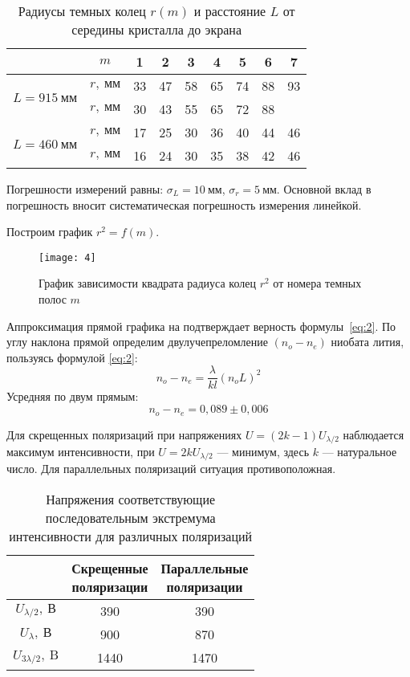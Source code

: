 \documentclass[a4paper, 12pt]{article}
\begin{document}
\renewcommand{\arraystretch}{1.2}
\begin{table}[H]
\centering
\begin{tabular}{|c|c|c|c|c|c|c|c|c|}
\hline
                  & $m$ & 1  & 2  & 3  & 4  & 5  & 6  & 7  \\ \hline
    \multirow{2}{*}{$L = 915\ \text{мм}$} & $r,\ \text{мм}$ & 33 & 47 & 58 & 65 & 74 & 88 & 93 \\ \cline{2-9} 
                   & $r,\ \text{мм}$ & 30 & 43 & 55 & 65 & 72 & 88 &    \\ \hline
\multirow{2}{*}{$L = 460\ \text{мм}$} & $r,\ \text{мм}$ & 17 & 25 & 30 & 36 & 40 & 44 & 46 \\ \cline{2-9} 
                   & $r,\ \text{мм}$ & 16 & 24 & 30 & 35 & 38 & 42 & 46 \\ \hline
\end{tabular}
\caption{Радиусы темных колец $r(m)$ и расстояние $L$ от середины
кристалла до экрана}
\end{table}

Погрешности измерений равны: $\sigma_L = 10\ \text{мм}$, $\sigma_r =
5\ \text{мм}$. Основной вклад в погрешность вносит систематическая
погрешность измерения линейкой.

Построим график $r^2 = f(m)$. 
\begin{figure}[H]
    \texttt{[image: 4]} 
    \caption{График зависимости квадрата радиуса колец $r^2$ от номера
    темных полос $m$}
    \label{fig:4}
\end{figure}

Аппроксимация прямой графика на  подтверждает верность
формулы~\eqref{eq:2}. По углу наклона прямой определим
двулучепреломление $(n_o-n_e)$ ниобата лития, пользуясь формулой
\eqref{eq:2}:
\[
    n_o - n_e = \frac{\lambda}{k l}(n_o L)^2
\]
Усредняя по двум прямым:
\[
    n_o - n_e = 0,089\pm 0,006
\]

Для скрещенных поляризаций при напряжениях $U = (2k-1)U_{\lambda/2}$
наблюдается максимум интенсивности, при $U = 2k U_{\lambda/2}$ ---
минимум, здесь $k$ --- натуральное число. Для параллельных поляризаций
ситуация противоположная.

\begin{table}[H]
\centering
\begin{tabular}{|c|c|c|}
\hline
 & \specialcell{Скрещенные\\[-5pt]поляризации}    &
\specialcell{Параллельные\\[-5pt]поляризации} \\ \hline
$U_{\lambda/2},\ \text{В}$ & 390  & 390  \\ \hline
$U_{\lambda},\ \text{В}$ & 900  & 870  \\ \hline
$U_{3\lambda/2},\ \text{B}$ & 1440 & 1470 \\ \hline
\end{tabular}
\caption{Напряжения соответствующие последовательным экстремума
интенсивности для различных поляризаций}
\end{table}
\end{document}

